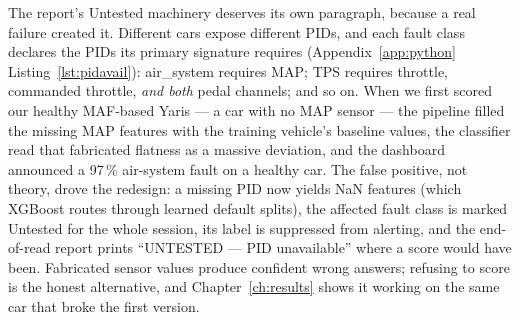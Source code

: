 The report's Untested machinery deserves its own paragraph, because a real
failure created it. Different cars expose different PIDs, and each fault
class declares the PIDs its primary signature requires
(Appendix~\ref{app:python} Listing~\ref{lst:pidavail}): air\_system
requires MAP; TPS requires throttle, commanded throttle, \emph{and both}
pedal channels; and so on. When we first scored our healthy MAF-based Yaris
--- a car with no MAP sensor --- the pipeline filled the missing MAP
features with the training vehicle's baseline values, the classifier read
that fabricated flatness as a massive deviation, and the dashboard
announced a 97\,\% air-system fault on a healthy car. The false positive,
not theory, drove the redesign: a missing PID now yields NaN features
(which XGBoost routes through learned default splits), the affected fault
class is marked Untested for the whole session, its label is suppressed
from alerting, and the end-of-read report prints ``UNTESTED --- PID
unavailable'' where a score would have been. Fabricated sensor values
produce confident wrong answers; refusing to score is the honest
alternative, and Chapter~\ref{ch:results} shows it working on the same car
that broke the first version.
